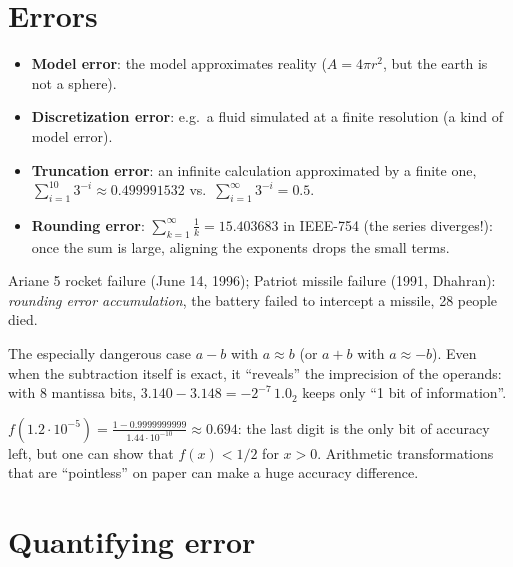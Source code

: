 \documentclass[11pt,a4paper,openany]{book}
\begin{document}
\section{Errors}

\begin{defnbox}[title=Types of errors]
\begin{itemize}
  \item \textbf{Model error}: the model approximates reality ($A = 4\pi r^2$, but the earth is
        not a sphere).
  \item \textbf{Discretization error}: e.g.\ a fluid simulated at a finite resolution (a kind of
        model error).
  \item \textbf{Truncation error}: an infinite calculation approximated by a finite one,
        $\sum_{i=1}^{10} 3^{-i} \approx 0.499991532$ vs.\ $\sum_{i=1}^{\infty} 3^{-i} = 0.5$.
  \item \textbf{Rounding error}: $\sum_{k=1}^{\infty} \frac{1}{k} = 15.403683$ in IEEE-754 (the
        series diverges!): once the sum is large, aligning the exponents drops the small terms.
\end{itemize}
\end{defnbox}

\begin{exbox}[title=Catastrophic numerical errors]
Ariane 5 rocket failure (June 14, 1996); Patriot missile failure (1991, Dhahran):
\emph{rounding error accumulation}, the battery failed to intercept a missile, 28 people died.
\end{exbox}


\begin{defnbox}[title=Catastrophic cancellation]
The especially dangerous case $a - b$ with $a \approx b$ (or $a + b$ with $a \approx -b$). Even
when the subtraction itself is exact, it ``reveals'' the imprecision of the operands: with 8
mantissa bits, $3.140 - 3.148 = -2^{-7}\,1.0_2$ keeps only ``1 bit of information''.
\end{defnbox}

\begin{exbox}[title={$f(x) = (1 - \cos x)/x^2$}]
$f(1.2 \cdot 10^{-5}) = \frac{1 - 0.9999999999}{1.44 \cdot 10^{-10}} \approx 0.694$: the last
digit is the only bit of accuracy left, but one can show that $f(x) < 1/2$ for $x > 0$.
Arithmetic transformations that are ``pointless'' on paper can make a huge accuracy difference.
\end{exbox}


\section{Quantifying error}
\end{document}
